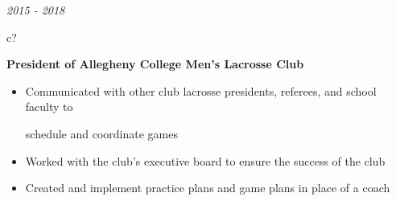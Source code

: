 \documentclass[12pt,a4paper,sans]{moderncv} %
\begin{document}
 
\textit{2015 - 2018}
\hspace{1 mm}
\begin{tabular}{c?}
 \\
\end{tabular}
 \hspace{1 mm}
 \textbf{President of Allegheny College Men's Lacrosse Club} 
 \vspace{0 mm}
 \begin{itemize}
 \addtolength{\itemindent}{31.7 mm}
 \item{Communicated with other club lacrosse presidents, referees, and school faculty to 
 
 \hspace{32 mm}schedule and coordinate games}
 
 
 \item{Worked with the club's executive board to ensure the success of the club }
 \item{Created and implement practice plans and game plans in place of a coach}
 \end{itemize}
 
  
\begin{comment}
\textit{2016 - 2018}
\hspace{2.0 mm}
\begin{tabular}{c?}
 \\
\end{tabular}
 \hspace{2 mm}
 \textbf{Radio Host: Chill JamZ} 
 \vspace{0 mm}
 \begin{itemize}
 \addtolength{\itemindent}{31.7 mm}
 \item{Cohost weekly music and talkshow}
 \item{Draft weekly radio-show plans consisting talking points and music to bring humor 
 
 \hspace{32 mm}and good tunes to my listeners}
 \end{itemize}
 \end{comment}


\end{document}
